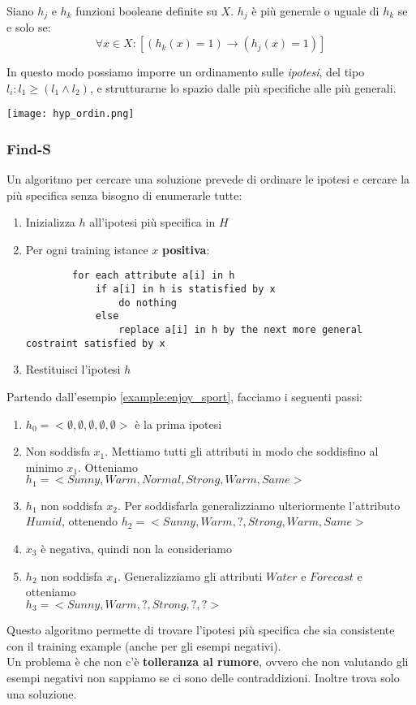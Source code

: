 \begin{definition}
	Siano $h_j$ e $h_k$ funzioni booleane definite su $X$. $h_j$ è più generale o uguale di $h_k$ se e solo se:
	\begin{equation}
		\forall x \in X : [(h_k(x) = 1) \to (h_j(x)=1)]
	\end{equation}
\end{definition}
In questo modo possiamo imporre un ordinamento sulle \textit{ipotesi}, del tipo $l_i : l_1 \geq (l_1 \land l_2)$, e strutturarne lo spazio dalle più specifiche alle più generali.
\begin{center}
	\texttt{[image: hyp\_ordin.png]}
\end{center}
\subsubsection{Find-S}
Un algoritmo per cercare una soluzione prevede di ordinare le ipotesi e cercare la più specifica senza bisogno di enumerarle tutte:
\begin{enumerate}
	\item Inizializza $h$ all'ipotesi più specifica in $H$
	\item Per ogni training istance $x$ \textbf{positiva}:
	\begin{lstlisting}
		for each attribute a[i] in h
			if a[i] in h is statisfied by x
				do nothing
			else
				replace a[i] in h by the next more general costraint satisfied by x
	\end{lstlisting}
	\item Restituisci l'ipotesi $h$
\end{enumerate}
\begin{example}
	Partendo dall'esempio \ref{example:enjoy_sport}, facciamo i seguenti passi:
	\begin{enumerate}
		\item $h_0=<\emptyset,\emptyset,\emptyset,\emptyset,\emptyset>$ è la prima ipotesi
		\item Non soddisfa $x_1$. Mettiamo tutti gli attributi in modo che soddisfino al minimo $x_1$. Otteniamo $h_1=<Sunny,Warm,Normal,Strong,Warm,Same>$
		\item $h_1$ non soddisfa $x_2$. Per soddisfarla generalizziamo ulteriormente l'attributo $Humid$, ottenendo $h_2=<Sunny,Warm,?,Strong,Warm,Same>$
		\item $x_3$ è negativa, quindi non la consideriamo
		\item $h_2$ non soddisfa $x_4$. Generalizziamo gli attributi $Water$ e $Forecast$ e otteniamo \\$h_3=<Sunny,Warm,?,Strong,?,?>$
	\end{enumerate}
\end{example}
Questo algoritmo permette di trovare l'ipotesi più specifica che sia consistente con il training example (anche per gli esempi negativi).\\
Un problema è che non c'è \textbf{tolleranza al rumore}, ovvero che non valutando gli esempi negativi non sappiamo se ci sono delle contraddizioni. Inoltre trova solo una soluzione.

